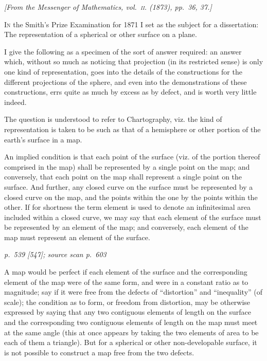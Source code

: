 \documentclass[11pt,a4paper]{article}
\newcommand{\sourcepage}[3]{%
  \bigskip
  \noindent\textit{p.~#1 [#2]; source scan p.~#3}%
  \par\smallskip
}
\begin{document}
\begin{center}
\textit{[From the Messenger of Mathematics, vol.~\textsc{ii}. (1873), pp.~36, 37.]}
\end{center}

\textsc{In} the Smith's Prize Examination for 1871 I set as the subject for a dissertation:
The representation of a spherical or other surface on a plane.

I give the following as a specimen of the sort of answer required: an answer which, without so much as noticing that projection (in its restricted sense) is only one kind of representation, goes into the details of the constructions for the different projections of the sphere, and even into the demonstrations of these constructions, errs quite as much by excess as by defect, and is worth very little indeed.

The question is understood to refer to Chartography, viz. the kind of representation is taken to be such as that of a hemisphere or other portion of the earth's surface in a map.

An implied condition is that each point of the surface (viz. of the portion thereof comprised in the map) shall be represented by a single point on the map; and conversely, that each point on the map shall represent a single point on the surface.
And further, any closed curve on the surface must be represented by a closed curve on the map, and the points within the one by the points within the other.
If for shortness the term element is used to denote an infinitesimal area included within a closed curve, we may say that each element of the surface must be represented by an element of the map; and conversely, each element of the map must represent an element of the surface.

\clearpage

\sourcepage{539}{547}{603}
A map would be perfect if each element of the surface and the corresponding element of the map were of the same form, and were in a constant ratio as to magnitude; say if it were free from the defects of ``distortion'' and ``inequality'' (of scale); the condition as to form, or freedom from distortion, may be otherwise expressed by saying that any two contiguous elements of length on the surface and the corresponding two contiguous elements of length on the map must meet at the same angle (this at once appears by taking the two elements of area to be each of them a triangle).
But for a spherical or other non-developable surface, it is not possible to construct a map free from the two defects.
\end{document}
